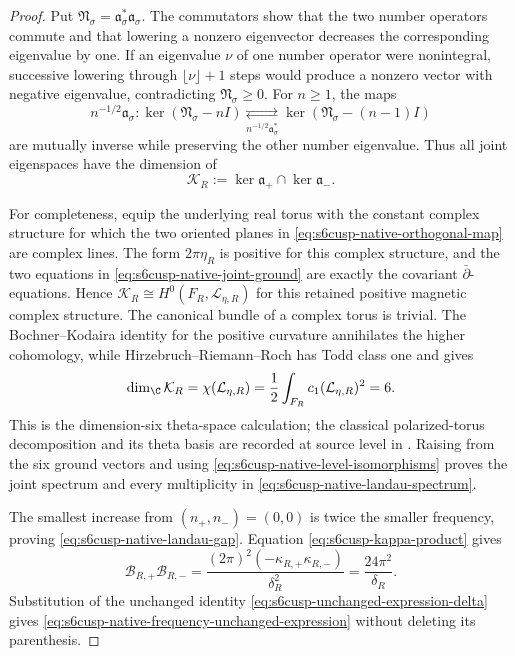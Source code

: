 \begin{proof}
Put \(\mathfrak N_\sigma=\mathfrak a_\sigma^*\mathfrak a_\sigma\).
The commutators show that the two number operators commute and that
lowering a nonzero eigenvector decreases the corresponding eigenvalue by
one.  If an eigenvalue \(\nu\) of one number operator were nonintegral,
successive lowering through \(\lfloor\nu\rfloor+1\) steps would produce a
nonzero vector with negative eigenvalue, contradicting
\(\mathfrak N_\sigma\ge0\).  For \(n\ge1\), the maps
\begin{equation}\label{eq:s6cusp-native-level-isomorphisms}
 n^{-1/2}\mathfrak a_\sigma:
 \ker(\mathfrak N_\sigma-nI)
 \underset{n^{-1/2}\mathfrak a_\sigma^*}{\rightleftarrows}
 \ker(\mathfrak N_\sigma-(n-1)I)
\end{equation}
are mutually inverse while preserving the other number eigenvalue.  Thus
all joint eigenspaces have the dimension of
\begin{equation}\label{eq:s6cusp-native-joint-ground}
 \mathcal K_R:=\ker\mathfrak a_+\cap\ker\mathfrak a_-.
\end{equation}

For completeness, equip the underlying real torus with the constant complex
structure for which the two oriented planes in
\eqref{eq:s6cusp-native-orthogonal-map} are complex lines.  The form
\(2\pi\eta_R\) is positive for this complex structure, and the two equations
in \eqref{eq:s6cusp-native-joint-ground} are exactly the covariant
\(\bar\partial\)-equations.  Hence
\(\mathcal K_R\cong H^0(F_R,\mathcal L_{\eta,R})\) for this retained
positive magnetic complex structure.  The canonical bundle of a complex
torus is trivial.  The Bochner--Kodaira identity for the positive curvature
annihilates the higher cohomology, while Hirzebruch--Riemann--Roch has
Todd class one and gives
\[
 \dim_\C\mathcal K_R
 =\chi(\mathcal L_{\eta,R})
 =\frac12\int_{F_R}c_1(\mathcal L_{\eta,R})^2=6.
\]
This is the dimension-six theta-space calculation; the classical
polarized-torus decomposition and its theta basis are recorded at source
level in \cite{Tyurin1999}.  Raising from the six ground vectors and using
\eqref{eq:s6cusp-native-level-isomorphisms} proves the joint spectrum and
every multiplicity in \eqref{eq:s6cusp-native-landau-spectrum}.

The smallest increase from \((n_+,n_-)=(0,0)\) is twice the smaller
frequency, proving \eqref{eq:s6cusp-native-landau-gap}.  Equation
\eqref{eq:s6cusp-kappa-product} gives
\[
 \mathcal B_{R,+}\mathcal B_{R,-}
  =\frac{(2\pi)^2(-\kappa_{R,+}\kappa_{R,-})}{\delta_R^2}
  =\frac{24\pi^2}{\delta_R}.
\]
Substitution of the unchanged identity
\eqref{eq:s6cusp-unchanged-expression-delta} gives
\eqref{eq:s6cusp-native-frequency-unchanged-expression} without deleting
its parenthesis.


\end{proof}

